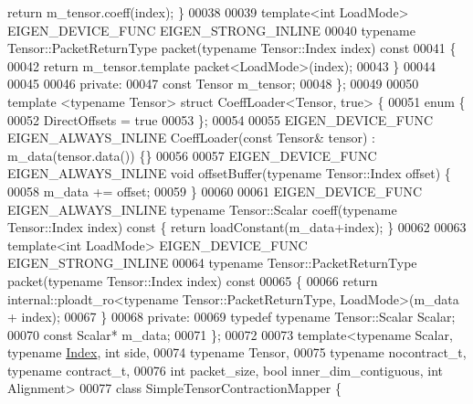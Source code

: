 \begin{DoxyCode}
       \textcolor{keywordflow}{return} m\_tensor.coeff(index); \}
00038 
00039  \textcolor{keyword}{template}<\textcolor{keywordtype}{int} LoadMode> EIGEN\_DEVICE\_FUNC EIGEN\_STRONG\_INLINE
00040  \textcolor{keyword}{typename} Tensor::PacketReturnType packet(\textcolor{keyword}{typename} Tensor::Index index)\textcolor{keyword}{ const}
00041 \textcolor{keyword}{  }\{
00042     \textcolor{keywordflow}{return} m\_tensor.template packet<LoadMode>(index);
00043   \}
00044 
00045 
00046  \textcolor{keyword}{private}:
00047   \textcolor{keyword}{const} Tensor m\_tensor;
00048 \};
00049 
00050 \textcolor{keyword}{template} <\textcolor{keyword}{typename} Tensor> \textcolor{keyword}{struct }CoeffLoader<Tensor, true> \{
00051   \textcolor{keyword}{enum} \{
00052     DirectOffsets = \textcolor{keyword}{true}
00053   \};
00054 
00055   EIGEN\_DEVICE\_FUNC EIGEN\_ALWAYS\_INLINE CoeffLoader(\textcolor{keyword}{const} Tensor& tensor) : m\_data(tensor.data()) \{\}
00056 
00057   EIGEN\_DEVICE\_FUNC EIGEN\_ALWAYS\_INLINE \textcolor{keywordtype}{void} offsetBuffer(\textcolor{keyword}{typename} Tensor::Index offset) \{
00058     m\_data += offset;
00059   \}
00060 
00061   EIGEN\_DEVICE\_FUNC EIGEN\_ALWAYS\_INLINE \textcolor{keyword}{typename} Tensor::Scalar coeff(\textcolor{keyword}{typename} Tensor::Index index)\textcolor{keyword}{ const }\{
       \textcolor{keywordflow}{return} loadConstant(m\_data+index); \}
00062 
00063  \textcolor{keyword}{template}<\textcolor{keywordtype}{int} LoadMode> EIGEN\_DEVICE\_FUNC EIGEN\_STRONG\_INLINE
00064  \textcolor{keyword}{typename} Tensor::PacketReturnType packet(\textcolor{keyword}{typename} Tensor::Index index)\textcolor{keyword}{ const}
00065 \textcolor{keyword}{  }\{
00066     \textcolor{keywordflow}{return} internal::ploadt\_ro<typename Tensor::PacketReturnType, LoadMode>(m\_data + index);
00067   \}
00068  \textcolor{keyword}{private}:
00069   \textcolor{keyword}{typedef} \textcolor{keyword}{typename} Tensor::Scalar Scalar;
00070   \textcolor{keyword}{const} Scalar* m\_data;
00071 \};
00072 
00073 \textcolor{keyword}{template}<\textcolor{keyword}{typename} Scalar, \textcolor{keyword}{typename} \hyperlink{namespace_eigen_a62e77e0933482dafde8fe197d9a2cfde}{Index}, \textcolor{keywordtype}{int} side,
00074          \textcolor{keyword}{typename} Tensor,
00075          \textcolor{keyword}{typename} nocontract\_t, \textcolor{keyword}{typename} contract\_t,
00076          \textcolor{keywordtype}{int} packet\_size, \textcolor{keywordtype}{bool} inner\_dim\_contiguous, \textcolor{keywordtype}{int} Alignment>
00077 \textcolor{keyword}{class }SimpleTensorContractionMapper \{

\end{DoxyCode}
